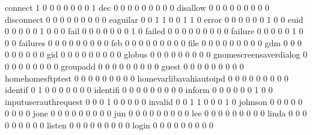 \documentclass[compress,8pt]{beamer}
\begin{document}
\begin{frame}
\begin{Schunk}
  connect                                    1   0   0   0   0   0   0   0   1
  dec                                        0   0   0   0   0   0   0   0   0
  disallow                                   0   0   0   0   0   0   0   0   0
  disconnect                                 0   0   0   0   0   0   0   0   0
  eaguilar                                   0   0   1   1   0   0   1   1   0
  error                                      0   0   0   0   0   0   1   0   0
  euid                                       0   0   0   0   0   1   0   0   0
  fail                                       0   0   0   0   0   0   0   1   0
  failed                                     0   0   0   0   0   0   0   0   0
  failure                                    0   0   0   0   0   1   0   0   0
  failures                                   0   0   0   0   0   0   0   0   0
  feb                                        0   0   0   0   0   0   0   0   0
  file                                       0   0   0   0   0   0   0   0   0
  gdm                                        0   0   0   0   0   0   0   0   0
  gid                                        0   0   0   0   0   0   0   0   0
  globus                                     0   0   0   0   0   0   0   0   0
  gnomescreensaverdialog                     0   0   0   0   0   0   0   0   0
  groupadd                                   0   0   0   0   0   0   0   0   0
  guest                                      0   0   0   0   0   0   0   0   0
  homehomesftptest                           0   0   0   0   0   0   0   0   0
  homevarlibavahiautoipd                     0   0   0   0   0   0   0   0   0
  identif                                    0   1   0   0   0   0   0   0   0
  identifi                                   0   0   0   0   0   0   0   0   0
  inform                                     0   0   0   0   0   0   1   0   0
  inputuserauthrequest                       0   0   0   1   0   0   0   0   0
  invalid                                    0   0   1   1   0   0   0   1   0
  johnson                                    0   0   0   0   0   0   0   0   0
  jone                                       0   0   0   0   0   0   0   0   0
  jun                                        0   0   0   0   0   0   0   0   0
  lee                                        0   0   0   0   0   0   0   0   0
  linda                                      0   0   0   0   0   0   0   0   0
  listen                                     0   0   0   0   0   0   0   0   0
  login                                      0   0   0   0   0   0   0   0   0

\end{Schunk}
\end{frame}
\end{document}
